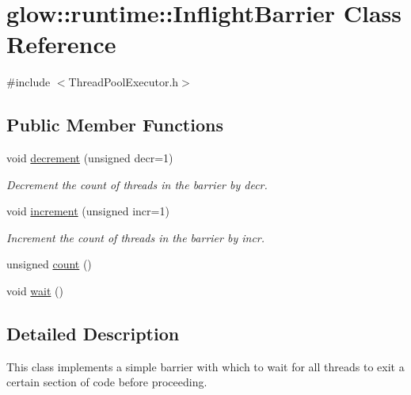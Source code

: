 \hypertarget{classglow_1_1runtime_1_1_inflight_barrier}{}\section{glow\+:\+:runtime\+:\+:Inflight\+Barrier Class Reference}
\label{classglow_1_1runtime_1_1_inflight_barrier}


{\ttfamily \#include $<$Thread\+Pool\+Executor.\+h$>$}

\subsection*{Public Member Functions}
\begin{DoxyCompactItemize}
\item 
\mbox{\label{classglow_1_1runtime_1_1_inflight_barrier_abf738a3af8dd0057205c920509e59fcc}} 
void \hyperlink{classglow_1_1runtime_1_1_inflight_barrier_abf738a3af8dd0057205c920509e59fcc}{decrement} (unsigned decr=1)
\begin{DoxyCompactList}\small\item\em Decrement the count of threads in the barrier by {\ttfamily decr}. \end{DoxyCompactList}\item 
\mbox{\label{classglow_1_1runtime_1_1_inflight_barrier_a8523fb920c54488ef8943d395ccbd0bf}} 
void \hyperlink{classglow_1_1runtime_1_1_inflight_barrier_a8523fb920c54488ef8943d395ccbd0bf}{increment} (unsigned incr=1)
\begin{DoxyCompactList}\small\item\em Increment the count of threads in the barrier by {\ttfamily incr}. \end{DoxyCompactList}\item 
unsigned \hyperlink{classglow_1_1runtime_1_1_inflight_barrier_acf13957d21ca846a19bc77c8bb841b27}{count} ()
\item 
void \hyperlink{classglow_1_1runtime_1_1_inflight_barrier_a65478337f00c3da7f5b557ba52789b30}{wait} ()
\end{DoxyCompactItemize}


\subsection{Detailed Description}
This class implements a simple barrier with which to wait for all threads to exit a certain section of code before proceeding. 

